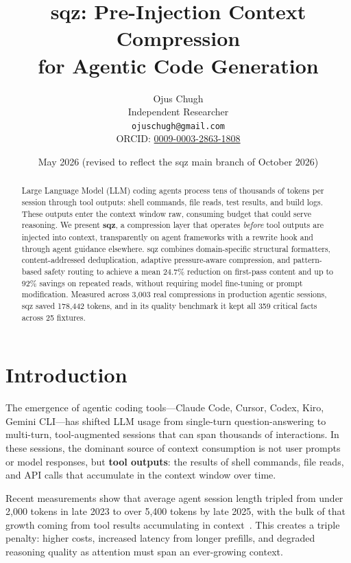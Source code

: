 \documentclass[10pt,twocolumn]{article}
\title{\textbf{sqz: Pre-Injection Context Compression\\for Agentic Code Generation}}
\author{
  Ojus Chugh\\
  Independent Researcher\\
  \texttt{ojuschugh@gmail.com}\\
  ORCID: \href{https://orcid.org/0009-0003-2863-1808}{0009-0003-2863-1808}
}
\date{May 2026 (revised to reflect the sqz main branch of October 2026)}
\begin{document}
\maketitle

\begin{abstract}
Large Language Model (LLM) coding agents process tens of thousands of tokens per session through tool outputs: shell commands, file reads, test results, and build logs. These outputs enter the context window raw, consuming budget that could serve reasoning. We present \textbf{sqz}, a compression layer that operates \emph{before} tool outputs are injected into context, transparently on agent frameworks with a rewrite hook and through agent guidance elsewhere. sqz combines domain-specific structural formatters, content-addressed deduplication, adaptive pressure-aware compression, and pattern-based safety routing to achieve a mean 24.7\% reduction on first-pass content and up to 92\% savings on repeated reads, without requiring model fine-tuning or prompt modification. Measured across 3,003 real compressions in production agentic sessions, sqz saved 178,442 tokens, and in its quality benchmark it kept all 359 critical facts across 25 fixtures.
\end{abstract}

\section{Introduction}

The emergence of agentic coding tools---Claude Code, Cursor, Codex, Kiro, Gemini CLI---has shifted LLM usage from single-turn question-answering to multi-turn, tool-augmented sessions that can span thousands of interactions. In these sessions, the dominant source of context consumption is not user prompts or model responses, but \textbf{tool outputs}: the results of shell commands, file reads, and API calls that accumulate in the context window over time.

Recent measurements show that average agent session length tripled from under 2,000 tokens in late 2023 to over 5,400 tokens by late 2025, with the bulk of that growth coming from tool results accumulating in context~\cite{pan2026tool}. This creates a triple penalty: higher costs, increased latency from longer prefills, and degraded reasoning quality as attention must span an ever-growing context.
\end{document}
